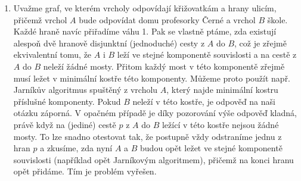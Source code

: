 \documentclass[12pt,a4paper]{article}
\theoremstyle{plain}
\begin{document}
\begin{enumerate}[1.]
\item Uvažme graf, ve kterém vrcholy odpovídají křižovatkám a hrany ulicím, přičemž vrchol $A$ bude odpovídat domu profesorky Černé a vrchol $B$ škole. Každé hraně navíc přiřadíme váhu 1. Pak se vlastně ptáme, zda existují alespoň dvě hranově disjunktní (jednoduché) cesty z $A$ do $B$, což je zřejmě ekvivalentní tomu, že $A$ i $B$ leží ve stejné komponentě souvislosti a na cestě z $A$ do $B$ neleží žádné mosty. Přitom každý most v této komponentě zřejmě musí ležet v minimální kostře této komponenty. Můžeme proto použít např. Jarníkův algoritmus spuštěný z vrcholu $A$, který najde minimální kostru příslušné komponenty. Pokud $B$ neleží v této kostře, je odpověď na naši otázku záporná. V opačném případě je díky pozorování výše odpověď kladná, právě když na (jediné) cestě $p$ z $A$ do $B$ ležící v této kostře nejsou žádné mosty. To lze snadno otestovat tak, že postupně vždy odstraníme jednu z hran $p$ a zkusíme, zda nyní $A$ a $B$ budou opět ležet ve stejné komponentě souvislosti (například opět Jarníkovým algoritmem), přičemž na konci hranu opět přidáme. Tím je problém vyřešen.
\end{enumerate}
\end{document}
